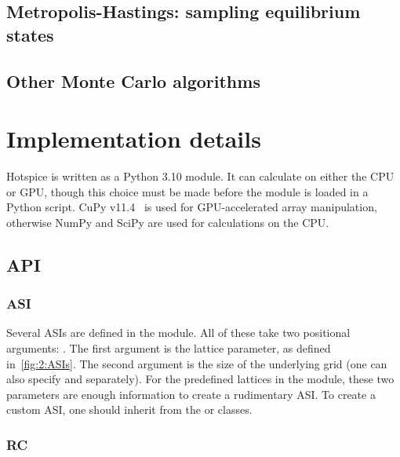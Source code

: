 \subsection{Metropolis-Hastings: sampling equilibrium states}
\subsection{Other Monte Carlo algorithms} %

\section{Implementation details}\label{sec:2:Implementation}
Hotspice is written as a Python 3.10 module.
It can calculate on either the CPU or GPU, though this choice must be made before the \hotspice module is loaded in a Python script.
CuPy v11.4~\cite{CuPy} is used for GPU-accelerated array manipulation, otherwise NumPy and SciPy are used for calculations on the CPU. \par
\subsection{API} %
\subsubsection{ASI}
Several ASIs are defined in the  module.
All of these take two positional arguments: .
The first argument is the lattice parameter, as defined in~\cref{fig:2:ASIs}.
The second argument is the size of the underlying grid (one can also specify  and  separately).
For the predefined lattices in the  module, these two parameters are enough information to create a rudimentary ASI.
To create a custom ASI, one should inherit from the  or  classes.

\subsubsection{RC}
